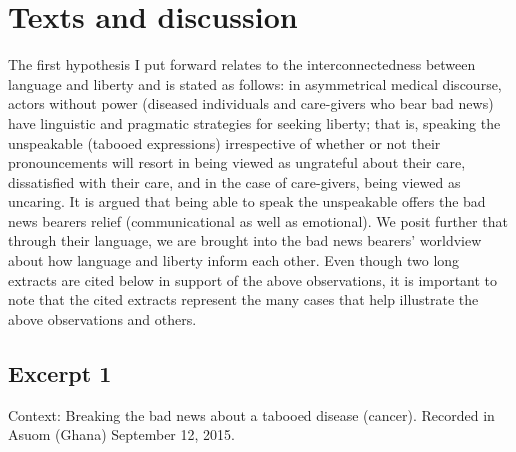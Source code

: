 \documentclass[output=paper,colorlinks,citecolor=brown]{langscibook}
\begin{document}
\section{Texts and discussion}\label{sec:obeng:4}

The first hypothesis I put forward relates to the interconnectedness between language and liberty and is stated as follows: in asymmetrical medical discourse, actors without power (diseased individuals and care-givers who bear bad news) have linguistic and pragmatic strategies for seeking liberty; that is, speaking the unspeakable (tabooed expressions) irrespective of whether or not their pronouncements will resort in being viewed as ungrateful about their care, dissatisfied with their care, and in the case of care-givers, being viewed as uncaring. It is argued that being able to speak the unspeakable offers the bad news bearers relief (communicational as well as emotional). We posit further that through their language, we are brought into the bad news bearers’ worldview about how language and liberty inform each other. Even though two long extracts are cited below in support of the above observations, it is important to note that the cited extracts represent the many cases that help illustrate the above observations and others.

\subsection{Excerpt 1}\label{sec:obeng:4.1}
Context: Breaking the bad news about a tabooed disease (cancer). Recorded in Asuom (Ghana) September 12, 2015.
\end{document}
